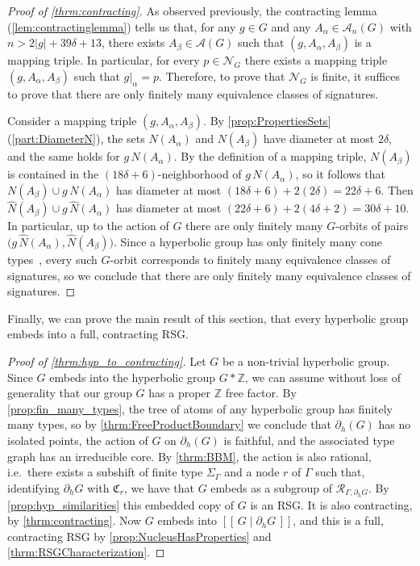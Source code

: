 \documentclass[11pt,letterpaper]{amsart}
\theoremstyle{definition}
\newcommand{\Z}{\mathbb{Z}}
\newcommand{\R}{\mathcal{R}}
\newcommand{\Nuc}{\mathcal{N}}
\newcommand{\C}{\mathfrak{C}}
\newcommand{\A}{\mathcal{A}}
\begin{document}
\begin{proof}[Proof of \cref{thrm:contracting}]
As observed previously, the contracting lemma (\cref{lem:contractinglemma}) tells us that, for any $g\in G$ and any $A_\alpha\in \A_n(G)$ with $n>2|g|+39\delta+13$, there exists $A_\beta\in\A(G)$ such that $(g,A_\alpha,A_\beta)$ is a mapping triple. In particular, for every $p\in \Nuc_G$ there exists a mapping triple $(g,A_\alpha,A_\beta)$ such that $g|_\alpha = p$.  Therefore, to prove that $\Nuc_G$ is finite, it suffices to prove that there are only finitely many equivalence classes of signatures.

Consider a mapping triple $(g,A_\alpha,A_\beta)$. By \cref{prop:PropertiesSets}(\ref{part:DiameterN}), the sets $N(A_\alpha)$ and $N(A_\beta)$ have diameter at most $2\delta$, and the same holds for $g\,N(A_\alpha)$.  By the definition of a mapping triple, $N(A_\beta)$ is contained in the $(18\delta+6)$-neighborhood of $g\,N(A_\alpha)$, so it follows that $N(A_\beta)\cup g\,N(A_\alpha)$ has diameter at most $(18\delta+6)+2(2\delta) = 22\delta+6$.  Then $\widehat{N}(A_\beta)\cup g\,\widehat{N}(A_\alpha)$ has diameter at most $(22\delta+6)+2(4\delta+2)=30\delta +10$.  In particular, up to the action of $G$ there are only finitely many $G$\mbox{-}orbits of pairs $\bigl(g\,\widehat{N}(A_\alpha),\widehat{N}(A_\beta)\bigr)$. Since a hyperbolic group has only finitely many cone types~\cite{Cannon1}, every such $G$\mbox{-}orbit corresponds to finitely many equivalence classes of signatures, so we conclude that there are only finitely many equivalence classes of signatures.
\end{proof}

Finally, we can prove the main result of this section, that every hyperbolic group embeds into a full, contracting RSG.

\begin{proof}[Proof of \cref{thrm:hyp_to_contracting}]
Let $G$ be a non-trivial hyperbolic group. Since $G$ embeds into the hyperbolic group $G*\Z$, we can assume without loss of generality that our group $G$ has a proper $\Z$ free factor. By \cref{prop:fin_many_types}, the tree of atoms of any hyperbolic group has finitely many types, so by \cref{thrm:FreeProductBoundary} we conclude that $\partial_h(G)$ has no isolated points, the action of $G$ on $\partial_h(G)$ is faithful, and the associated type graph has an irreducible core. By \cref{thrm:BBM}, the action is also rational, i.e.\ there exists a subshift of finite type $\Sigma_\Gamma$ and a node $r$ of $\Gamma$ such that, identifying $\partial_h G$ with $\C_r$, we have that $G$ embeds as a subgroup of $\R_{\Gamma,\partial_h G}$. By \cref{prop:hyp_similarities} this embedded copy of $G$ is an RSG. It is also contracting, by \cref{thrm:contracting}. Now $G$ embeds into $[[\,G\mid \partial_h G\,]]$, and this is a full, contracting RSG by \cref{prop:NucleusHasProperties} and \cref{thrm:RSGCharacterization}.
\end{proof}
\end{document}
